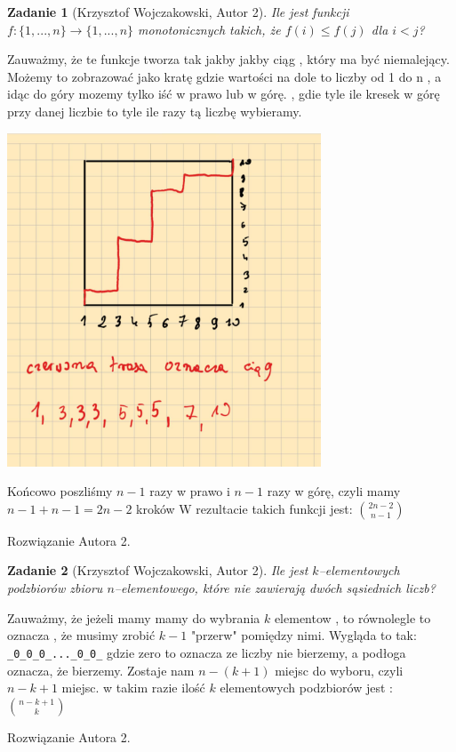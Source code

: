 \documentclass{mwart}
\newtheorem{zad}{Zadanie}[section]
\begin{document}
\begin{zad}[Krzysztof Wojczakowski, Autor 2]
    Ile jest funkcji $f:\{1, ..., n\} \to \{1, ..., n\}$ monotonicznych takich,
    że $f(i) \leq f(j) $ dla $i < j$?
\end{zad}
\begin{mdframed}
    Zauważmy, że te funkcje tworza tak jakby jakby ciąg , który ma być niemalejący. 
    Możemy to zobrazować jako kratę gdzie wartości na dole to liczby od 1 do n , a idąc do góry 
    mozemy tylko iść w prawo lub w górę. , gdie tyle ile kresek w górę przy danej liczbie to tyle ile razy tą liczbę wybieramy.
    \vspace{0.3em} %

    \noindent
    \centering
    \includegraphics[width=0.7\textwidth]{images/zadanie28.png}

    Końcowo poszliśmy $n-1$ razy w prawo i $n-1$ razy w górę, czyli mamy $n-1+n-1 = 2n - 2$ kroków
    W rezultacie takich funkcji jest:
    \( \binom{2n-2}{n-1} \)
\end{mdframed}
\begin{mdframed}
    Rozwiązanie Autora 2.
\end{mdframed}




\begin{zad}[Krzysztof Wojczakowski, Autor 2]
    Ile jest $k$--elementowych podzbiorów zbioru $n$--elementowego, które nie
    zawierają dwóch sąsiednich liczb?
\end{zad}
\begin{mdframed}
    Zauważmy, że jeżeli mamy mamy do wybrania $k$ elementow , to równolegle to oznacza , że 
    musimy zrobić $k-1$ "przerw" pomiędzy nimi. Wygląda to tak:
    \verb|_0_0_0_..._0_0_| 
    gdzie zero to oznacza ze liczby nie bierzemy, a podłoga oznacza, że bierzemy. 
    Zostaje nam $n-(k+1)$ miejsc do wyboru, czyli $n-k+1$ miejsc.
    w takim razie ilość $k$ elementowych podzbiorów jest : 
    \( \binom{n-k+1}{k} \)

\end{mdframed}
\begin{mdframed}
    Rozwiązanie Autora 2.
\end{mdframed}
\end{document}
